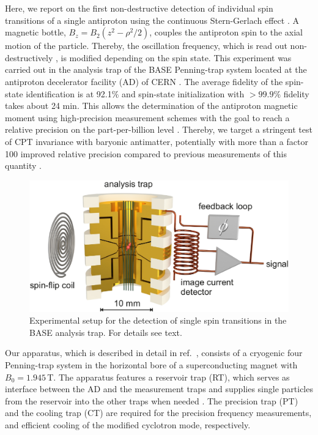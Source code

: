 \documentclass[preprint%
]{elsarticle}
\begin{document}
Here, we report on the first non-destructive detection of individual spin transitions of a single antiproton using the continuous Stern-Gerlach effect \cite{DehmeltCSGE}. A magnetic bottle, $B_z=B_2(z^2-\rho^2/2)$, couples the antiproton spin to the axial motion of the particle. Thereby, the oscillation frequency, which is read out non-destructively \cite{Wine}, is modified depending on the spin state. This experiment was carried out in the analysis trap of the BASE Penning-trap system located at the antiproton decelerator facility (AD) of CERN \cite{SmorraEPJST2015}. The average fidelity of the spin-state identification is at 92.1$\%$ and spin-state initialization with $>99.9\%$ fidelity takes about 24 min. This allows the determination of the antiproton magnetic moment using high-precision measurement schemes \cite{haeffner2003double,MooserPLB2013} with the goal to reach a relative precision on the part-per-billion level \cite{MooserNature2014}. Thereby, we target a stringent test of CPT invariance with baryonic antimatter, potentially with more than a factor 100 improved relative precision compared to previous measurements of this quantity \cite{Jack2013Antiproton,HiroNC2016}. %


\begin{figure}[htb]
        \centerline{\includegraphics[width=0.47 \textwidth,keepaspectratio]{FIG1SSF.pdf}}
            \caption[Filter]{Experimental setup for the detection of single spin transitions in the BASE analysis trap. For details see text.} 
						\label{fig1}
    \end{figure}


Our apparatus, which is described in detail in ref.~\cite{SmorraEPJST2015}, consists of a cryogenic four Penning-trap system in the horizontal bore of a superconducting magnet with $B_0 = 1.945\,$T. The apparatus features a reservoir trap (RT), which serves as interface between the AD and the measurement traps and supplies single particles from the reservoir into the other traps when needed \cite{SmorraIJMS2015}. The precision trap (PT) and the cooling trap (CT) are required for the precision frequency measurements, and efficient cooling of the modified cyclotron mode, respectively. 
\end{document}
